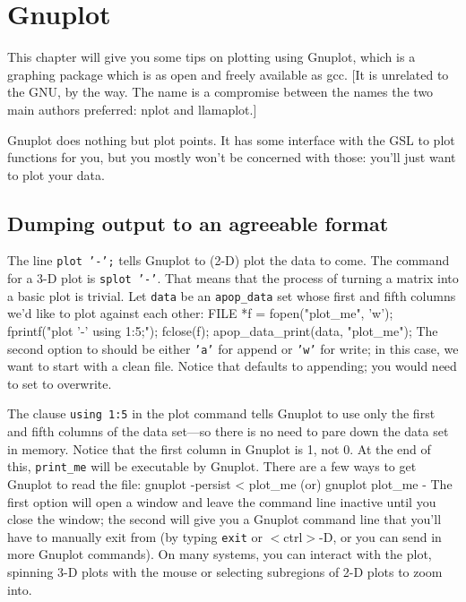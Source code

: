 \chapter{Gnuplot} \label{gnuplot}

This chapter will give you some tips on plotting using Gnuplot, which is a graphing package which is as
open and freely available as gcc. [It is unrelated to the GNU, by the way. The name is a compromise
between the names the two main authors preferred: nplot and llamaplot.]

Gnuplot does nothing but plot points. It has some interface with the GSL to plot functions for you, but
you mostly won't be concerned with those: you'll just want to plot your data.


\section{Dumping output to an agreeable format} 
The line {\tt plot '-';} tells Gnuplot to (2-D) plot the data to come. The
command for a 3-D plot is {\tt splot '-'}. That means that the process
of turning a matrix into a basic plot is trivial. Let {\tt data} be an
{\tt apop\_\-data} set whose first and fifth columns we'd like to plot
against each other:
FILE    *f = fopen("plot_me", 'w');
fprintf("plot '-' using 1:5;\n");
fclose(f);
apop_data_print(data, "plot_me");
The second option to  should be either {\tt 'a'} for append or
{\tt 'w'} for write; in this case, we want to start with a clean file.
Notice that  defaults to appending; you
would need to set  to overwrite.

The clause {\tt using 1:5} in the plot command tells Gnuplot to use
only the first and fifth columns of the data set---so there is no need to pare
down the data set in memory. Notice that the first column in Gnuplot is
1, not 0. At the end of this, {\tt print\_\-me} will be executable by
Gnuplot. There are a few ways to get Gnuplot to read the file:
gnuplot -persist < plot_me
(or)
gnuplot plot_me -
The first option will open a window and leave the command line inactive
until you close the window;
the second will give you a Gnuplot command line that you'll have to
manually exit
from (by typing {\tt exit} or $<$ctrl$>$-D, or you can send in more
Gnuplot commands). On many systems, you can
interact with the plot, spinning 3-D plots with the mouse or selecting
subregions of 2-D plots to zoom into.

